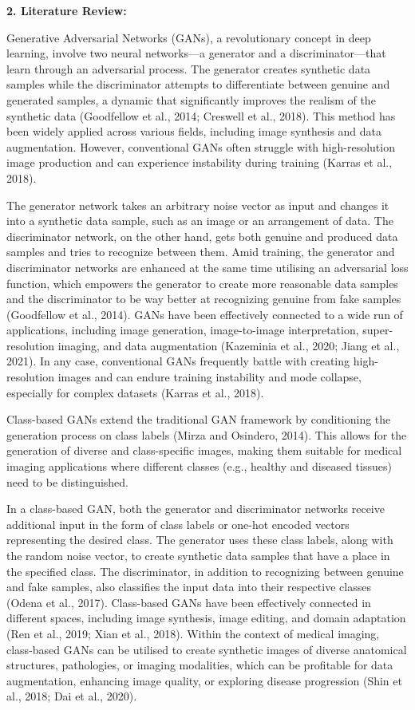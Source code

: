 \documentclass[
]{article}
\begin{document}
\textbf{2. Literature Review:}

Generative Adversarial Networks (GANs), a revolutionary concept in deep
learning, involve two neural networks---a generator and a
discriminator---that learn through an adversarial process. The generator
creates synthetic data samples while the discriminator attempts to
differentiate between genuine and generated samples, a dynamic that
significantly improves the realism of the synthetic data (Goodfellow et
al., 2014; Creswell et al., 2018). This method has been widely applied
across various fields, including image synthesis and data augmentation.
However, conventional GANs often struggle with high-resolution image
production and can experience instability during training (Karras et
al., 2018).

The generator network takes an arbitrary noise vector as input and
changes it into a synthetic data sample, such as an image or an
arrangement of data. The discriminator network, on the other hand, gets
both genuine and produced data samples and tries to recognize between
them. Amid training, the generator and discriminator networks are
enhanced at the same time utilising an adversarial loss function, which
empowers the generator to create more reasonable data samples and the
discriminator to be way better at recognizing genuine from fake samples
(Goodfellow et al., 2014). GANs have been effectively connected to a
wide run of applications, including image generation, image-to-image
interpretation, super-resolution imaging, and data augmentation
(Kazeminia et al., 2020; Jiang et al., 2021). In any case, conventional
GANs frequently battle with creating high-resolution images and can
endure training instability and mode collapse, especially for complex
datasets (Karras et al., 2018).

Class-based GANs extend the traditional GAN framework by conditioning
the generation process on class labels (Mirza and Osindero, 2014). This
allows for the generation of diverse and class-specific images, making
them suitable for medical imaging applications where different classes
(e.g., healthy and diseased tissues) need to be distinguished.

In a class-based GAN, both the generator and discriminator networks
receive additional input in the form of class labels or one-hot encoded
vectors representing the desired class. The generator uses these class
labels, along with the random noise vector, to create synthetic data
samples that have a place in the specified class. The discriminator, in
addition to recognizing between genuine and fake samples, also
classifies the input data into their respective classes (Odena et al.,
2017). Class-based GANs have been effectively connected in different
spaces, including image synthesis, image editing, and domain adaptation
(Ren et al., 2019; Xian et al., 2018). Within the context of medical
imaging, class-based GANs can be utilised to create synthetic images of
diverse anatomical structures, pathologies, or imaging modalities, which
can be profitable for data augmentation, enhancing image quality, or
exploring disease progression (Shin et al., 2018; Dai et al., 2020).
\end{document}
